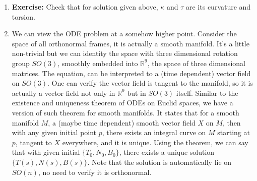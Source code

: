 \begin{remark}\hfill
\begin{enumerate}[(1)]
    \item \textbf{Exercise:} Check that for solution given above, \(\kappa\) and
        \(\tau\) are its curvature and torsion.
    \item We can view the ODE problem at a somehow higher point. Consider the space
        of all orthonormal frames, it is actually a smooth manifold. It's a little
        non-trivial but we can identity the space with three dimensional rotation
        group \(SO(3)\), smoothly embedded into \(\mathbb{R}^9\), the space of
        three dimensional matrices. The equation, can be interpreted to a (time
        dependent) vector field on \(SO(3)\). One can verify the vector field
        is tangent to the manifold, so it is actually a vector field not only in
        \(\mathbb{R}^9\) but in \(SO(3)\) itself. Similar to the existence and
        uniqueness theorem of ODEs on Euclid spaces, we have a version of such
        theorem for smooth manifolds. It states that for a smooth manifold \(M\),
        a (maybe time dependent) smooth vector field \(X\) on \(M\), then with any
        given initial point \(p\), there exists an integral curve on \(M\) starting
        at \(p\), tangent to \(X\) everywhere, and it is unique. Using the theorem,
        we can say that with given initial \(\{T_0,N_0,B_0\}\), there exists a
        unique solution \(\{T(s),N(s),B(s)\}\). Note that the solution is
        automatically lie on \(SO(n)\), no need to verify it is orthonormal.
\end{enumerate}
\end{remark}
